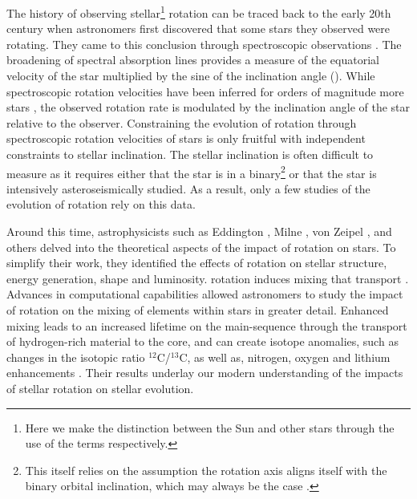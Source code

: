 The history of observing stellar\footnote{Here we make the distinction between the Sun and other stars through the use of the terms  respectively.} rotation can be traced back to the early 20th century when astronomers first discovered that some stars they observed were rotating. 
They came to this conclusion through spectroscopic observations \citep{elvey_contours_1929, struve_stellar_1930, struve_axial_1930}.
The broadening of spectral absorption lines provides a measure of the equatorial velocity of the star multiplied by the sine of the inclination angle (\vsini).
While spectroscopic rotation velocities have been inferred for orders of magnitude more stars , the observed rotation rate is modulated by the  inclination angle of the star relative to the observer.
Constraining the evolution of rotation through spectroscopic rotation velocities of stars is only fruitful with independent constraints to stellar inclination.
The stellar inclination is often difficult to measure as it requires either that the star is in a binary\footnote{This itself relies on the assumption the rotation axis aligns itself with the binary orbital inclination, which may always be the case \citet{albrecht_banana_2011,albrecht_banana_2013}.} or that the star is intensively asteroseismically studied.
As a result, only a few studies of the evolution of rotation rely on this data.

Around this time, astrophysicists such as Eddington \citep{eddington_conditions_1918,eddington_internal_1926,eddington_internal_1929}, Milne \citep{milne_equilibrium_1923}, von Zeipel \citep{von_zeipel_radiative_1924}, and others delved into the theoretical aspects of the impact of rotation on stars.
To simplify their work, they identified the effects of rotation on stellar structure, energy generation, shape and luminosity. 
 rotation induces mixing that  transport .
Advances in computational capabilities allowed astronomers to study the impact of rotation on the mixing of elements within stars in greater detail. 
Enhanced mixing leads to an increased lifetime on the main-sequence through the transport of hydrogen-rich material to the core, and can create isotope anomalies, such as changes in the isotopic ratio $^{12}$C/$^{13}$C, as well as, nitrogen, oxygen and lithium enhancements \citep{maeder_evolution_2000,heger_presupernova_2000,charbonnel_lithium_1994}.
Their results underlay our modern understanding of the impacts of stellar rotation on stellar evolution.

